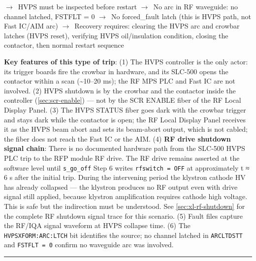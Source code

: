 \begin{timeline}
{      $\rightarrow$~HVPS must be inspected before restart\newline
      $\rightarrow$~No arc in RF waveguide: no channel latched, FSTFLT = 0\newline
      $\rightarrow$~No forced\_fault latch (this is HVPS path, not Fast IC/AIM arc)\newline
      $\rightarrow$~Recovery requires: clearing the HVPS arc and crowbar latches\newline
      (HVPS reset), verifying HVPS oil/insulation condition, closing the\newline
      contactor, then normal restart sequence}
\end{timeline}

\begin{keynote}
\textbf{Key features of this type of trip}: (1) The HVPS controller is the only actor: its trigger boards fire the crowbar in hardware, and its SLC-500 opens the contactor within a scan (\textasciitilde10--20 ms); the RF MPS PLC and Fast IC are not involved. (2) HVPS shutdown is by the crowbar and the contactor inside the controller (\cref{sec:scr-enable}) --- not by the SCR ENABLE fiber of the RF Local Display Panel. (3) The HVPS STATUS fiber goes dark with the crowbar trigger and stays dark while the contactor is open; the RF Local Display Panel receives it as the HVPS beam abort and sets its beam-abort output, which is not cabled; the fiber does not reach the Fast IC or the AIM. (4) \textbf{RF drive shutdown signal chain}: There is no documented hardware path from the SLC-500 HVPS PLC trip to the RFP module RF drive. The RF drive remains asserted at the software level until \texttt{s\_go\_off} Step 6 writes \texttt{rfswitch\ =\ OFF} at approximately t ≈ 6 s after the initial trip. During the intervening period the klystron cathode HV has already collapsed --- the klystron produces no RF output even with drive signal still applied, because klystron amplification requires cathode high voltage. This is safe but the indirection must be understood. See \cref{sec:xl-rf-shutdown} for the complete RF shutdown signal trace for this scenario. (5) Fault files capture the RF/IQA signal waveform at HVPS collapse time. (6) The \texttt{HVPSXFORM:\allowbreak{}ARC:\allowbreak{}LTCH} bit identifies the source; no channel latched in \texttt{ARCLTDSTT} and \texttt{FSTFLT\ =\ 0} confirm no waveguide arc was involved.
\end{keynote}

\begin{center}\rule{0.5\linewidth}{0.5pt}\end{center}

